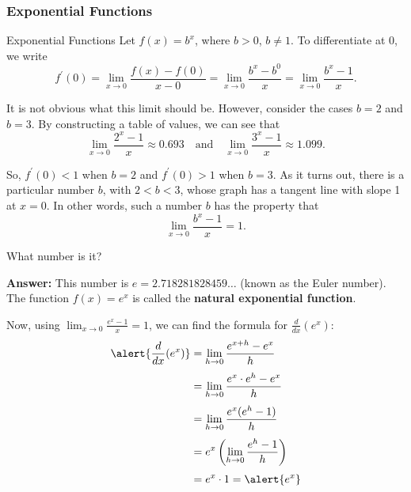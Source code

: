 \documentclass[cal1spr16Lectures.tex]{subfiles}
\begin{document}
\subsubsection{Exponential Functions}

\begin{frame}{\small Exponential Functions}\footnotesize
Let $f(x)=b^x$, where $b>0$, $b \neq 1$.  To differentiate at $0$, we write
\[f^{\prime}(0)=\lim_{x \to 0}\frac{f(x)-f(0)}{x-0}=\lim_{x \to 0} \frac{b^x-b^0}{x}=
\lim_{x \to 0} \frac{b^x-1}{x}.\]

\vspace{1pc}
It is not obvious what this limit should be.  However, consider the cases $b=2$ and $b=3$.  By constructing a table of values, we can see that 
\[\lim_{x \to 0} \frac{2^x-1}{x} \approx 0.693 \quad \text{and}\quad \lim_{x \to 0} \frac{3^x-1}{x} \approx 1.099.\]
\end{frame}

\begin{frame}\footnotesize
So, $f^{\prime}(0)<1$ when $b=2$ and $f^{\prime}(0)>1$ when $b=3$.  As it turns out, there is a particular number $b$, with $2<b<3$, whose graph has a tangent line with slope 1 at $x=0$.  In other words, such a number $b$ has the property that 
\[\lim_{x \to 0} \frac{b^x-1}{x}=1.\]
\begin{que}What number is it? \end{que}
{\bf Answer:} This number is $e=2.718281828459 \dots$ (known as the Euler number).  The function $f(x)=e^x$ is called the \alert{\bf natural exponential function}.
\end{frame}

\begin{frame}\footnotesize
Now, using  $\displaystyle\lim_{x \to 0} \frac{e^x-1}{x}=1$, we can find the formula for $\frac{d}{dx}(e^x)$:
\begin{align*}
\alert{\frac{d}{dx}(e^x)} &= \lim_{h \to 0} \frac{e^{x+h}-e^x}{h} \\[0.25pc]
 &= \lim_{h \to 0}\frac{e^x \cdot e^h -e^x}{h} \\[0.25pc]
 &= \lim_{h\to 0}\frac{e^x(e^h-1)}{h} \\[0.25pc]
 &=e^x \left(\lim_{h \to 0} \frac{e^h-1}{h}\right) \\[0.25pc]
  &= e^x \cdot 1 = \alert{e^x}
\end{align*}
\end{frame}
\end{document}
